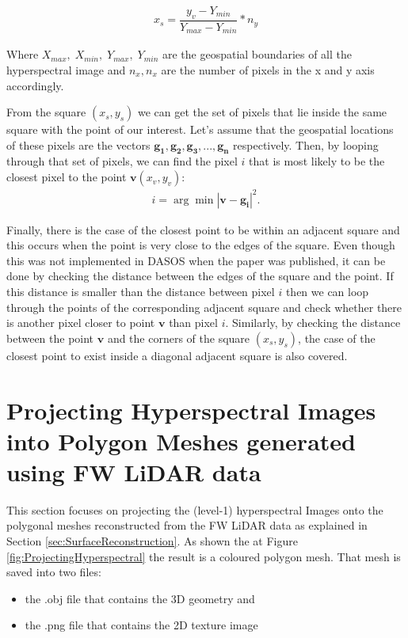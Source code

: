 \documentclass{subfiles}
\begin{document}
	 \begin{eqnarray}
	 x_s = \dfrac{y_v-Y_{min}}{Y_{max}-Y_{min}} * n_y 
	 \end{eqnarray}
 
	\par Where $X_{max},\; X_{min},\; Y_{max},\; Y_{min} $ are the geospatial boundaries of all the hyperspectral image and $n_x, n_x$ are the number of pixels in the x and y axis accordingly. 
	
	\par From the square $(x_s,y_s)$ we can get the set of pixels that lie inside the same square with the point of our interest. Let’s assume that the geospatial locations of these pixels are the vectors $\mathbf{g_1},\mathbf{g_2}, \mathbf{g_3}, ... , \mathbf{g_n}$ respectively. Then, by looping through that set of pixels, we can find the pixel $i$ that is most likely to be the closest pixel to the point $\mathbf{v}(x_v , y_v)$:
	\begin{eqnarray}
		i = \arg\min{|\mathbf{v}-\mathbf{g_i}|^2} .
	\end{eqnarray}
	
	\par Finally, there is the case of the closest point to be within an adjacent square and this occurs when the point is very close to the edges of the square. Even though this was not implemented in DASOS when the paper \cite{Miltiadou2015} was published, it can be done by checking the distance between the edges of the square and the point. If this distance is smaller than the distance between pixel $i$ then we can loop through the points of the corresponding adjacent square and check whether there is another pixel closer to point $\mathbf{v}$ than pixel $i$. Similarly, by checking the distance between the point $\mathbf{v}$ and the corners of the square $(x_s,y_s)$, the case of the closest point to exist inside a diagonal adjacent square is also covered. 
	
		
\section{Projecting Hyperspectral Images into Polygon Meshes generated using FW LiDAR data}\label{sec:ProjectingHyperspectral}
	\par This section focuses on projecting the (level-1) hyperspectral Images onto the polygonal meshes reconstructed from the FW LiDAR data as explained in Section \ref{sec:SurfaceReconstruction}. As shown the at Figure \ref{fig:ProjectingHyperspectral} the result is a coloured polygon mesh. That mesh is saved into two files: 
	 \begin{itemize}
	 	\item the .obj file that contains the 3D geometry and
	 	\item the .png file that contains the 2D texture image
	 \end{itemize} 	
\end{document}
